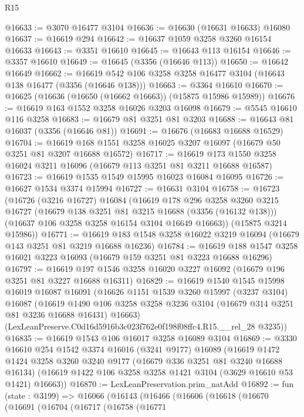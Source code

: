 \begin{lexlean}{R15}
\begin{coremodule}
@16633 := @3070 @16477 @3104
@16636 := @16630 (@16631 @16633) @16080
@16637 := @16619 @294
@16642 := @16637 @1059 @3258 @3260 @16154 @16633
@16643 := @3351 @16610
@16645 := @16643 @113 @16154
@16646 := @3357 @16610
@16649 := @16645 (@3356 (@16646 @113))
@16650 := @16642 @16649
@16662 := @16619 @542 @106 @3258 @3258 @16477 @3104 (@16643 @138 @16477 (@3356 (@16646 @138)))
@16663 := @3364 @16610
@16670 := @16625 (@16636 (@16650 (@16662 @16663)) (@15875 @15986 @15989))
@16676 := @16619 @163 @1552 @3258 @16026 @3203 @16098
@16679 := @5545 @16610 @116 @3258
@16683 := @16679 @81 @3251 @81 @3203
@16688 := @16643 @81 @16037 (@3356 (@16646 @81))
@16691 := @16676 (@16683 @16688 @16529)
@16704 := @16619 @168 @1551 @3258 @16025 @3207 @16097 (@16679 @50 @3251 @81 @3207 @16688 @16572)
@16717 := @16619 @173 @1550 @3258 @16024 @3211 @16096 (@16679 @113 @3251 @81 @3211 @16688 @16587)
@16723 := @16619 @1535 @1549 @15995 @16023 @16084 @16095
@16726 := @16627 @1534 @3374 @15994
@16727 := @16631 @3104
@16758 := @16723
    (@16726
      (@3216 @16727)
      @16084
      (@16619
        @178
        @296
        @3258
        @3260
        @3215
        @16727
        (@16679 @138 @3251 @81 @3215 @16688 (@3356 (@16132 @138)))
        (@16637 @106 @3258 @3258 @16154 @3104 @16649 @16663))
      (@15875 @3214 @15986))
@16771 := @16619 @183 @1548 @3258 @16022 @3219 @16094 (@16679 @143 @3251 @81 @3219 @16688 @16236)
@16784 := @16619 @188 @1547 @3258 @16021 @3223 @16093 (@16679 @159 @3251 @81 @3223 @16688 @16296)
@16797 := @16619 @197 @1546 @3258 @16020 @3227 @16092 (@16679 @196 @3251 @81 @3227 @16688 @16311)
@16829 := @16619
    @1540
    @1545
    @15998
    @16019
    @16087
    @16091
    (@16626
      @1151
      @1539
      @3260
      @15997
      (@3237 @3104)
      @16087
      (@16619 @1490 @106 @3258 @3258 @3236 @3104 (@16679 @314 @3251 @81 @3236 @16688 @16431) @16663)
      (LexLeanPreserve.C0d16d5916b3c023f762e0f198f08ffc4.R15.__rel_28 @3235))
@16835 := @16619 @1543 @106 @16017 @3258 @16089 @3104
@16869 := @3330
    @16610
    @254
    @1542
    @3374
    @16016
    (@3241 @9177)
    @16089
    (@16619
      @1472
      @1424
      @3258
      @3260
      @3240
      @9177
      (@16679 @336 @3251 @81 @3240 @16688 @16134)
      (@16619 @1422 @106 @3258 @3258 @1421 @3104 (@3629 @16610 @53 @1421) @16663))
@16870 := LexLeanPreservation.prim_natAdd
@16892 := fun (state : @3199) =>
  @16066
    (@16143
      (@16466
        (@16606
          (@16618
            (@16670
              (@16691
                (@16704
                  (@16717
                    (@16758
                      (@16771

\end{coremodule}
\end{lexlean}
